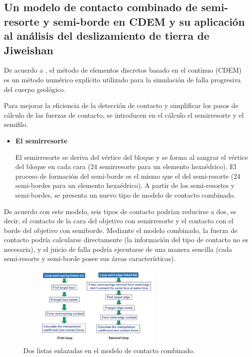 \documentclass[10pt,journal]{IEEEtran}
\begin{document}
\subsection{\textbf{Un modelo de contacto combinado de semi-resorte y semi-borde en CDEM y su aplicación al análisis del deslizamiento de tierra de Jiweishan}}
De acuerdo a \citep{semi}, el método de elementos discretos basado en el continuo (CDEM) es un método numérico explícito utilizado para la simulación de falla progresiva del cuerpo geológico. \par Para mejorar la eficiencia de la detección de contacto y simplificar los pasos de cálculo de las fuerzas de contacto, se introducen en el cálculo el semirresorte y el semifilo.
\begin{itemize}
    
    \item \textbf{El semirresorte} \par
    El semirresorte se deriva del vértice del bloque y se forma al sangrar el vértice del bloque en cada cara (24 semirresorte para un elemento hexaédrico). El proceso de formación del semi-borde es el mismo que el del semi-resorte (24 semi-bordes para un elemento hexaédrico). A partir de los semi-resortes y semi-bordes, se presenta un nuevo tipo de modelo de contacto combinado. 
\end{itemize}
De acuerdo con este modelo, seis tipos de contacto podrían reducirse a dos, es decir, el contacto de la cara del objetivo con semirresorte y el contacto con el borde del objetivo con semiborde. Mediante el modelo combinado, la fuerza de contacto podría calcularse directamente (la información del tipo de contacto no es necesaria), y el juicio de falla podría ejecutarse de una manera sencilla (cada semi-resorte y semi-borde posee sus áreas características).
\begin{figure}[H]
 \begin{center}
       \includegraphics[width=8cm, height=4cm]{figuras/2.JPG}
      \caption{Dos listas enlazadas en el modelo de contacto combinado.}
      \label{f2} 
      \end{center}
\end{figure}
\end{document}
